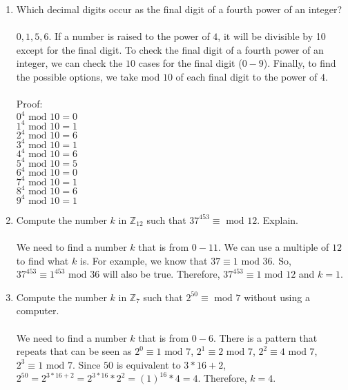 \documentclass[]{article}
\begin{document}
\begin{enumerate}
    \item Which decimal digits occur as the final digit of a fourth power of an integer?
    \\\\ $0,1,5,6$. If a number is raised to the power of $4$, it will be divisible by 10 except for the final digit. To check the final digit of a fourth power of an integer, we can check the $10$ cases for the final digit ($0-9$). Finally, to find the possible options, we take mod $10$ of each final digit to the power of $4$. 
    \\\\ Proof:
    \\ $0^4 \text{ mod } 10 = 0$
    \\ $1^4 \text{ mod } 10 = 1$
    \\ $2^4 \text{ mod } 10 = 6$
    \\ $3^4 \text{ mod } 10 = 1$
    \\ $4^4 \text{ mod } 10 = 6$
    \\ $5^4 \text{ mod } 10 = 5$
    \\ $6^4 \text{ mod } 10 = 0$
    \\ $7^4 \text{ mod } 10 = 1$
    \\ $8^4 \text{ mod } 10 = 6$
    \\ $9^4 \text{ mod } 10 = 1$

    \item Compute the number $k$ in $\mathbb{Z}_{12}$ such that $37^{453} \equiv \text{ mod } 12$. Explain.
    \\\\ We need to find a number $k$ that is from $0-11$. We can use a multiple of $12$ to find what $k$ is. For example, we know that $37 \equiv 1 \text{ mod } 36$. So, $37^{453} \equiv 1^{453} \text{ mod } 36$ will also be true. Therefore, $37^{453} \equiv 1 \text{ mod } 12$ and $k=1$.

    \item Compute the number $k$ in $\mathbb{Z}_{7}$ such that $2^{50} \equiv \text{ mod } 7$ without using a computer.
    \\\\ We need to find a number $k$ that is from $0-6$. There is a pattern that repeats that can be seen as $2^0 \equiv 1 \text{ mod }7$, $2^1 \equiv 2 \text{ mod }7$, $2^2 \equiv 4 \text{ mod }7$, $2^3 \equiv 1 \text{ mod }7$. Since $50$ is equivalent to $3*16+2$, $2^{50}=2^{3*16+2}=2^{3*16}*2^2=(1)^{16} * 4 = 4$. Therefore, $k=4$.


\end{enumerate}
\end{document}
